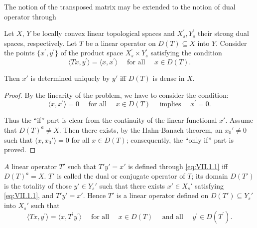 \label{chap:VII}


\label{sec:VII.1}

The notion of the transposed matrix may be extended to the notion of dual operator through 

\begin{theorem}\label{thm:VII.1.Theorem.1} Let $X$, $Y$ be locally convex linear topological spaces and $X_{s}^{\prime}, Y_{s}^{\prime}$ their strong dual spaces, respectively. Let $T$ be a linear operator on $D(T) \subseteq X$ into $Y$. Consider the points $\{x^{\prime}, y^{\prime}\}$ of the product space $X_{s}^{\prime} \times Y_{s}^{\prime}$ satisfying the condition 
\begin{equation}\label{eq:VII.1.1}
\langle T x, y ^{\prime} \rangle = \langle x, x ^{\prime} \rangle \quad \text{ for all } \quad x \in D (T).
\end{equation}
\end{theorem}

Then $x'$ is determined uniquely by $y'$ iff $D(T)$ is dense in $X$. 

\begin{proof}
 By the linearity of the problem, we have to consider the condition: 
\[
\langle x, x ^{\prime} \rangle = 0 \quad \text{ for all } \quad x \in D (T) \quad \text{ implies } \quad x ^{\prime} = 0. \]

Thus the ``if'' part is clear from the continuity of the linear functional $x'$. Assume that $D(T)^{a} \neq X$. Then there exists, by the Hahn-Banach theorem, an $x_{0}' \neq 0$ such that $\langle x, x_{0}' \rangle = 0$ for all $x \in D(T)$; consequently, the ``only if'' part is proved. 
\end{proof}

\begin{definition}\label{def:VII.1.Definition.1} $A$ linear operator $T'$ such that $T'y' = x'$ is defined through \eqref{eq:VII.1.1} iff $D(T)^a = X$. $T'$ is called the dual or conjugate operator of $T$; its domain $D(T')$ is the totality of those $y' \in Y_s'$ such that there exists $x' \in X_s'$ satisfying \eqref{eq:VII.1.1}, and $T'y' = x'$. Hence $T'$ is a linear operator defined on $D(T') \subseteq Y_s'$ into $X_s'$ such that 
\begin{equation}\label{eq:VII.1.2}
\langle T x, y ^{\prime} \rangle = \langle x, T ^{\prime} y ^{\prime} \rangle \quad \text{ for all } \quad x \in D (T) \quad \text{ and all } \quad y ^{\prime} \in D (T ^{\prime}).
\end{equation}
\end{definition}

